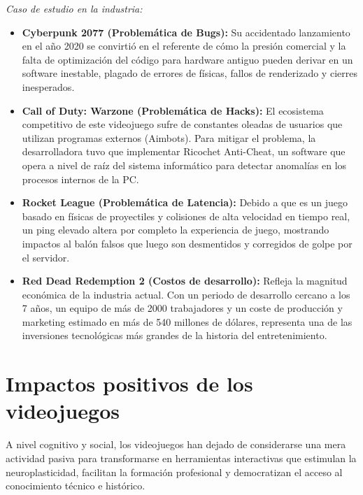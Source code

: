 \documentclass[12pt]{report}
\begin{document}
\textit{Caso de estudio en la industria:}
\begin{itemize}
    \item \textbf{Cyberpunk 2077 (Problemática de Bugs):} Su accidentado lanzamiento en el año 2020 se convirtió en el referente de cómo la presión comercial y la falta de optimización del código para hardware antiguo pueden derivar en un software inestable, plagado de errores de físicas, fallos de renderizado y cierres inesperados.
    \item \textbf{Call of Duty: Warzone (Problemática de Hacks):} El ecosistema competitivo de este videojuego sufre de constantes oleadas de usuarios que utilizan programas externos (Aimbots). Para mitigar el problema, la desarrolladora tuvo que implementar Ricochet Anti-Cheat, un software que opera a nivel de raíz del sistema informático para detectar anomalías en los procesos internos de la PC.
    \item \textbf{Rocket League (Problemática de Latencia):} Debido a que es un juego basado en físicas de proyectiles y colisiones de alta velocidad en tiempo real, un ping elevado altera por completo la experiencia de juego, mostrando impactos al balón falsos que luego son desmentidos y corregidos de golpe por el servidor.
    \item \textbf{Red Dead Redemption 2 (Costos de desarrollo):} Refleja la magnitud económica de la industria actual. Con un periodo de desarrollo cercano a los 7 años, un equipo de más de 2000 trabajadores y un coste de producción y marketing estimado en más de 540 millones de dólares, representa una de las inversiones tecnológicas más grandes de la historia del entretenimiento.
\end{itemize}

\section{Impactos positivos de los videojuegos}

A nivel cognitivo y social, los videojuegos han dejado de considerarse una mera actividad pasiva para transformarse en herramientas interactivas que estimulan la neuroplasticidad, facilitan la formación profesional y democratizan el acceso al conocimiento técnico e histórico.
\end{document}

